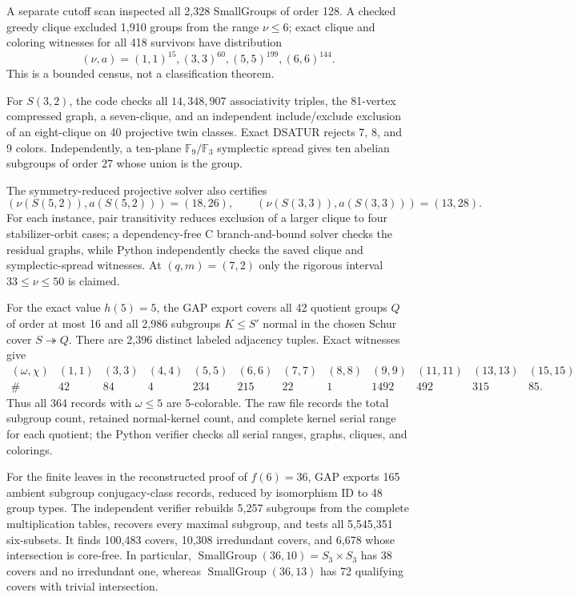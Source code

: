 A separate cutoff scan inspected all 2,328 SmallGroups of order 128. A
checked greedy clique excluded 1,910 groups from the range \(\nu\le6\); exact
clique and coloring witnesses for all 418 survivors have distribution
\[
 (\nu,a)=(1,1)^{15},(3,3)^{60},(5,5)^{199},(6,6)^{144}.
\]
This is a bounded census, not a classification theorem.

For \(S(3,2)\), the code checks all \(14{,}348{,}907\) associativity triples,
the 81-vertex compressed graph, a seven-clique, and an independent
include/exclude exclusion of an eight-clique on 40 projective twin classes.
Exact DSATUR rejects 7, 8, and 9 colors. Independently, a ten-plane
\(\mathbb F_9/\mathbb F_3\) symplectic spread gives ten abelian subgroups of
order 27 whose union is the group.

The symmetry-reduced projective solver also certifies
\[
 (\nu(S(5,2)),a(S(5,2)))=(18,26),\qquad
 (\nu(S(3,3)),a(S(3,3)))=(13,28).
\]
For each instance, pair transitivity reduces exclusion of a larger clique to
four stabilizer-orbit cases; a dependency-free C branch-and-bound solver
checks the residual graphs, while Python independently checks the saved
clique and symplectic-spread witnesses. At \((q,m)=(7,2)\) only the rigorous
interval \(33\le\nu\le50\) is claimed.

For the exact value \(h(5)=5\), the GAP export covers all 42 quotient groups
\(Q\) of order at most 16 and all 2,986 subgroups \(K\le S'\) normal in the
chosen Schur cover \(S\twoheadrightarrow Q\). There are 2,396 distinct
labeled adjacency tuples. Exact witnesses give
\[
\begin{array}{c|rrrrrrrrrrr}
(\omega,\chi)&(1,1)&(3,3)&(4,4)&(5,5)&(6,6)&(7,7)&(8,8)&(9,9)&(11,11)&(13,13)&(15,15)\\ \hline
\#&42&84&4&234&215&22&1&1492&492&315&85.
\end{array}
\]
Thus all 364 records with \(\omega\le5\) are 5-colorable. The raw file records
the total subgroup count, retained normal-kernel count, and complete kernel
serial range for each quotient; the Python verifier checks all serial ranges,
graphs, cliques, and colorings.

For the finite leaves in the reconstructed proof of $f(6)=36$, GAP exports
165 ambient subgroup conjugacy-class records, reduced by isomorphism ID to
48 group types.  The independent verifier rebuilds 5,257 subgroups from the
complete multiplication tables, recovers every maximal subgroup, and tests
all 5,545,351 six-subsets.  It finds 100,483 covers, 10,308 irredundant
covers, and 6,678 whose intersection is core-free.  In particular,
$\operatorname{SmallGroup}(36,10)=S_3\times S_3$ has 38 covers and no
irredundant one, whereas $\operatorname{SmallGroup}(36,13)$ has 72
qualifying covers with trivial intersection.

